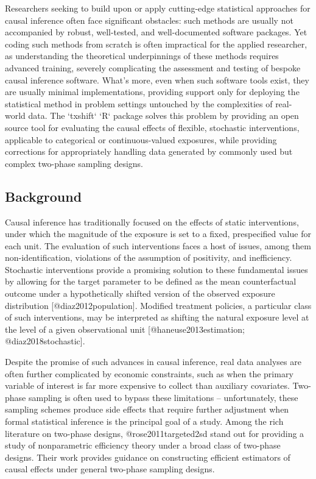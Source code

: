 Researchers seeking to build upon or apply cutting-edge statistical approaches
for causal inference often face significant obstacles: such methods are usually
not accompanied by robust, well-tested, and well-documented software packages.
Yet coding such methods from scratch is often impractical for the applied
researcher, as understanding the theoretical underpinnings of these methods
requires advanced training, severely complicating the assessment and testing of
bespoke causal inference software. What's more, even when such software tools
exist, they are usually minimal implementations, providing support only for
deploying the statistical method in problem settings untouched by the
complexities of real-world data. The `txshift` `R` package solves this problem
by providing an open source tool for evaluating the causal effects of flexible,
stochastic interventions, applicable to categorical or continuous-valued
exposures, while providing corrections for appropriately handling data generated
by commonly used but complex two-phase sampling designs.

\subsection{Background}

Causal inference has traditionally focused on the effects of static
interventions, under which the magnitude of the exposure is set to a fixed,
prespecified value for each unit. The evaluation of such interventions faces
a host of issues, among them non-identification, violations of the assumption of
positivity, and inefficiency. Stochastic interventions provide a promising
solution to these fundamental issues by allowing for the target parameter to be
defined as the mean counterfactual outcome under a hypothetically shifted
version of the observed exposure distribution [@diaz2012population].
Modified treatment policies, a particular class of such interventions, may be
interpreted as shifting the natural exposure level at the level of a given
observational unit [@haneuse2013estimation; @diaz2018stochastic].

Despite the promise of such advances in causal inference, real data analyses are
often further complicated by economic constraints, such as when the primary
variable of interest is far more expensive to collect than auxiliary covariates.
Two-phase sampling is often used to bypass these limitations -- unfortunately,
these sampling schemes produce side effects that require further adjustment when
formal statistical inference is the principal goal of a study. Among the rich
literature on two-phase designs, @rose2011targeted2sd stand out for providing
a study of nonparametric efficiency theory under a broad class of two-phase
designs. Their work provides guidance on constructing efficient estimators of
causal effects under general two-phase sampling designs.

